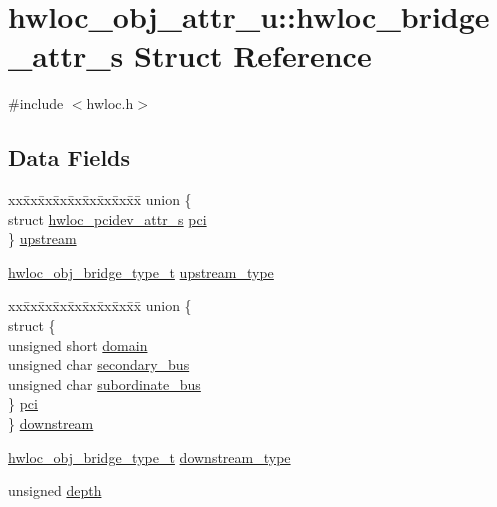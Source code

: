 \hypertarget{a00266}{}\section{hwloc\+\_\+obj\+\_\+attr\+\_\+u\+:\+:hwloc\+\_\+bridge\+\_\+attr\+\_\+s Struct Reference}
\label{a00266}


{\ttfamily \#include $<$hwloc.\+h$>$}

\subsection*{Data Fields}
\begin{DoxyCompactItemize}
\item 
\begin{tabbing}
xx\=xx\=xx\=xx\=xx\=xx\=xx\=xx\=xx\=\kill
union \{\\
\>struct \hyperlink{a00262}{hwloc\_pcidev\_attr\_s} \hyperlink{a00266_ab5c564e7c95b747dae9eb84ec0a2c31e}{pci}\\
\} \hyperlink{a00266_a00ce9d99fc8792d1044fe25dc58605fe}{upstream}\\

\end{tabbing}\item 
\hyperlink{a00184_ga0a947e8c5adcc729b126bd09c01a0153}{hwloc\+\_\+obj\+\_\+bridge\+\_\+type\+\_\+t} \hyperlink{a00266_a265dd2164aa2df4972e25a029da72125}{upstream\+\_\+type}
\item 
\begin{tabbing}
xx\=xx\=xx\=xx\=xx\=xx\=xx\=xx\=xx\=\kill
union \{\\
\>struct \{\\
\>\>unsigned short \hyperlink{a00266_a2c31e565a5f0d23d0a0a3dd3ec8f4b17}{domain}\\
\>\>unsigned char \hyperlink{a00266_ae2d9dd73ef1d32045c584a8e66d2f83f}{secondary\_bus}\\
\>\>unsigned char \hyperlink{a00266_af3f3f7d76bf03e8d2afa721c2b8d6771}{subordinate\_bus}\\
\>\} \hyperlink{a00266_a5a20be20e09d811d141b6332ff864706}{pci}\\
\} \hyperlink{a00266_acaf1ae02e37182bbb6966f8c4f35e499}{downstream}\\

\end{tabbing}\item 
\hyperlink{a00184_ga0a947e8c5adcc729b126bd09c01a0153}{hwloc\+\_\+obj\+\_\+bridge\+\_\+type\+\_\+t} \hyperlink{a00266_ac6a169b672d0e9f75756fd5665828b93}{downstream\+\_\+type}
\item 
unsigned \hyperlink{a00266_a336c8b22893d5d734d8c9dfca4066b46}{depth}
\end{DoxyCompactItemize}


